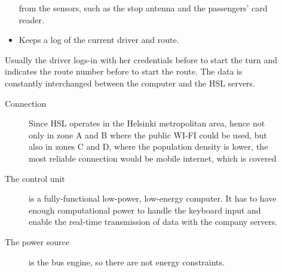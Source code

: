 \documentclass[a4paper, 12pt]{article}
\begin{document}
\begin{description}
\begin{itemize}
				from the sensors, such as the stop antenna and the passengers'
				card reader.
		    \item Keeps a log of the current driver and route. 
		\end{itemize}
		Usually the driver logs-in with her credentials before to start the turn
		and indicates the route number before to start the route. The data is
		constantly interchanged between the computer and the HSL servers.
		\begin{description}
			\item[Connection] Since HSL operates in the Helsinki metropolitan area, hence not only in
		zone A and B where the public WI-FI could be used, but also in zones C
		and D, where the population density is lower, the most reliable
		connection would be mobile internet, which is covered 
		    \item[The control unit] is a fully-functional low-power, low-energy 
				computer. It has to have enough computational power to handle
				the keyboard input and enable the real-time transmission of
				data with the company servers. 
			\item[The power source] is the bus engine, so there are not energy
				constraints.
		\end{description}
\end{description}



\medskip

\printbibliography


\doclicenseThis
\end{document}
